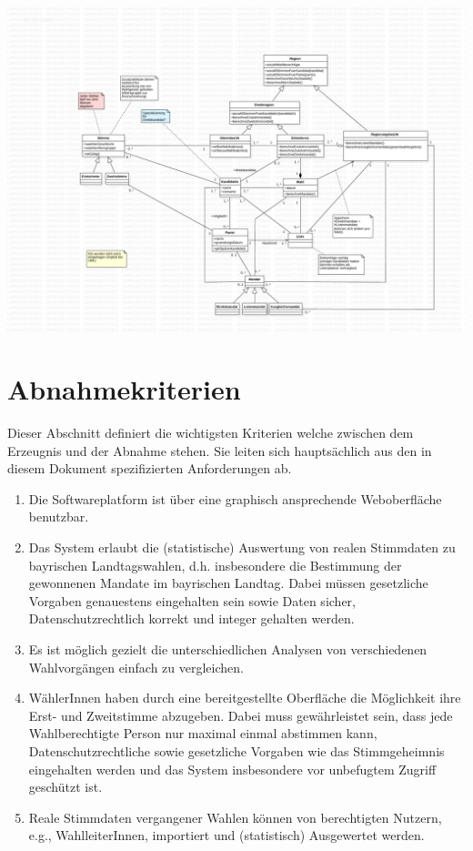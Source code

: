 \documentclass[a4paper,12pt]{article}
\begin{document}
\begin{center}
	\includegraphics[width=\textwidth]{../model.pdf}
\end{center}

\section{Abnahmekriterien}
Dieser Abschnitt definiert die wichtigsten Kriterien welche zwischen dem Erzeugnis und der Abnahme stehen.
Sie leiten sich hauptsächlich aus den in diesem Dokument spezifizierten Anforderungen ab.

\begin{enumerate}
  \item Die Softwareplatform ist über eine graphisch ansprechende Weboberfläche benutzbar.
  \item Das System erlaubt die (statistische) Auswertung von realen Stimmdaten zu bayrischen Landtagswahlen, d.h. 
        insbesondere die Bestimmung der gewonnenen Mandate im bayrischen Landtag. Dabei müssen gesetzliche
        Vorgaben genauestens eingehalten sein sowie Daten sicher, Datenschutzrechtlich korrekt und integer gehalten
        werden.
  \item Es ist möglich gezielt die unterschiedlichen Analysen von verschiedenen Wahlvorgängen einfach zu vergleichen.
  \item WählerInnen haben durch eine bereitgestellte Oberfläche die Möglichkeit ihre Erst- und Zweitstimme abzugeben.
        Dabei muss gewährleistet sein, dass jede Wahlberechtigte Person nur maximal einmal abstimmen kann, 
        Datenschutzrechtliche sowie gesetzliche Vorgaben wie das Stimmgeheimnis eingehalten werden und das System 
        insbesondere vor unbefugtem Zugriff geschützt ist.
  \item Reale Stimmdaten vergangener Wahlen können von berechtigten Nutzern, e.g., WahlleiterInnen, importiert und
        (statistisch) Ausgewertet werden.
\end{enumerate}
\end{document}
